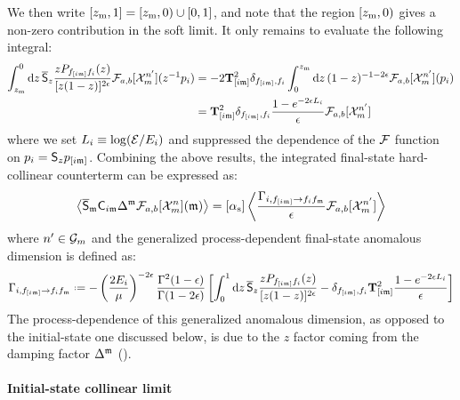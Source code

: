 We then write $ [z_\text{m},1] = [z_\text{m},0) \cup [0,1] $, and note that the region $ [z_\text{m},0) $ gives a non-zero contribution in the soft limit. It only remains to evaluate the following integral:
\begin{equation*}
  \begin{split}
    \int_{z_\text{m}}^0 \mathrm{d} z\, \overline{\mathsf{S}}_z  \frac{z P_{f_{[i\mathfrak{m}]}f_i}(z)}{[z (1-z)]^{2\epsilon}} \mathcal{F}_{a,b}[\mathcal{X}^{n'}_{m}](z^{-1}p_i)
    & = - 2 \mathbf{T}^2_{[i\mathfrak{m}]} \delta_{f_{[i\mathfrak{m}]},f_i} \int_0^{z_\text{m}} \mathrm{d} z\, (1 - z)^{-1-2\epsilon} \mathcal{F}_{a,b}[\mathcal{X}^{n'}_{m}](p_i) \\
    & = \mathbf{T}^2_{[i\mathfrak{m}]} \delta_{f_{[i\mathfrak{m}]},f_i} \frac{1 - e^{-2 \epsilon L_i}}{\epsilon} \mathcal{F}_{a,b}[\mathcal{X}^{n'}_{m}]
  \end{split}
\end{equation*}
where we set $ L_i \equiv \log (\mathcal{E} / E_i) $ and suppressed the dependence of the $ \mathcal{F} $ function on $ p_i = \mathsf{S}_z p_{[i\mathfrak{m}]} $. Combining the above results, the integrated final-state hard-collinear counterterm can be expressed as:
\begin{equation}
  \left\langle \overline{\mathsf{S}}_{\mathfrak{m}} \mathsf{C}_{i\mathfrak{m}} \Delta^{\mathfrak{m}} \mathcal{F}_{a,b}[\mathcal{X}^{n}_{m}](\mathfrak{m}) \right\rangle = [\alpha_\text{s}] \left\langle \frac{\Gamma_{i,f_{[i\mathfrak{m}]} \rightarrow f_i f_{\mathfrak{m}}}}{\epsilon} \mathcal{F}_{a,b}[\mathcal{X}^{n'}_{m}] \right\rangle
  \label{eq:hc-fs}
\end{equation}
where $ n' \in \mathcal{G}_m $ and the generalized process-dependent final-state anomalous dimension is defined as:
\begin{equation}
  \Gamma_{i,f_{[i\ur]} \rightarrow f_i f_\ur} \defeq - \left( \frac{2E_i}{\mu} \right)^{-2\de} \frac{\Gamma^2(1-\de)}{\Gamma(1-2\de)} \left[ \int_0^1 \dd z\, \oso_z \frac{z \spl_{f_{[i\ur]}f_i}(z)}{[z (1-z)]^{2\de}} - \delta_{f_{[i\ur]},f_i} \tco^2_{[i\ur]} \frac{1 - e^{-2\de \leg_i}}{\de} \right]
  \label{eq:fin-gen-an-dim-pd}
\end{equation}
The process-dependence of this generalized anomalous dimension, as opposed to the initial-state one discussed below, is due to the $ z $ factor coming from the damping factor $ \Delta^{\mathfrak{m}} $ ().

\paragraph{Initial-state collinear limit}

